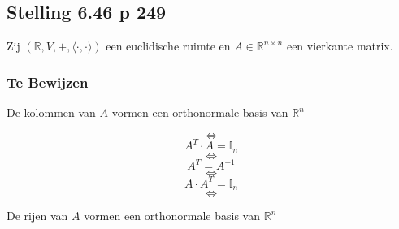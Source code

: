 \documentclass[lineaire_algebra_oplossingen.tex]{subfiles}
\begin{document}
\subsection{Stelling 6.46 p 249}
\label{6.46}
Zij $(\mathbb{R},V,+,\langle \cdot , \cdot \rangle)$ een euclidische ruimte en $A\in \mathbb{R}^{n\times n}$ een vierkante matrix.

\subsubsection*{Te Bewijzen}
\begin{center}
De kolommen van $A$ vormen een orthonormale basis van $\mathbb{R}^n$
\end{center}
\[\Leftrightarrow\]
\[A^T \cdot A = \mathbb{I}_n\]
\[\Leftrightarrow\]
\[A^T =A^{-1}\]
\[\Leftrightarrow\]
\[A \cdot A^T = \mathbb{I}_n\]
\[\Leftrightarrow\]
\begin{center}
De rijen van $A$ vormen een orthonormale basis van $\mathbb{R}^n$
\end{center}
\end{document}
